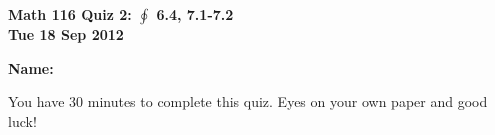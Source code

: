 \documentclass[11pt,letterpaper]{article}
\begin{document}
\flushleft
\begin{multicols}{2}


\begin{large}\textbf{Math 116 Quiz 2: $\oint$ 6.4, 7.1-7.2 \\
Tue 18 Sep 2012}\end{large}

\textbf{Name:  }\underline{\hspace{35ex}}

\vspace{.5in}

\end{multicols}

\pagestyle{empty}


\flushleft

You have 30 minutes to complete this quiz.  Eyes on your own paper and good luck!
\end{document}
